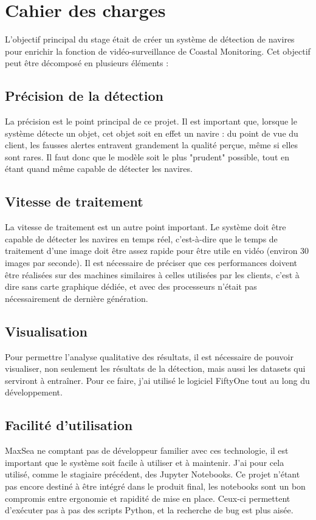 \chapter{Cahier des charges}

L'objectif principal du stage était de créer un système de détection de navires pour enrichir la fonction de 
vidéo-surveillance de Coastal Monitoring. Cet objectif peut être décomposé en plusieurs éléments : 

\section{Précision de la détection}

La précision est le point principal de ce projet. Il est important que, lorsque le 
système détecte un objet, cet objet soit en effet un navire : du point de vue du client, 
les fausses alertes entravent grandement la qualité perçue, même si elles sont rares. 
Il faut donc que le modèle soit le plus "prudent" possible, tout en étant quand même
capable de détecter les navires.

\section{Vitesse de traitement}

La vitesse de traitement est un autre point important. Le système doit être capable 
de détecter les navires en temps réel, c'est-à-dire que le temps de traitement d'une image
doit être assez rapide pour être utile en vidéo (environ 30 images par seconde).
Il est nécessaire de préciser que ces performances doivent être réalisées sur 
des machines similaires à celles utilisées par les clients, c'est à dire sans 
carte graphique dédiée, et avec des processeurs n'était pas nécessairement de 
dernière génération. 

\section{Visualisation}

Pour permettre l'analyse qualitative des résultats, il est nécessaire de pouvoir visualiser, 
non seulement les résultats de la détection, mais aussi les datasets qui serviront à entraîner. 
Pour ce faire, j'ai utilisé le logiciel FiftyOne tout au long du développement. 

\section{Facilité d'utilisation\label{facilite_utilisation}}

MaxSea ne comptant pas de développeur familier avec ces technologie, 
il est important que le système soit facile à utiliser et à maintenir.
J'ai pour cela utilisé, comme le stagiaire précédent, des Jupyter Notebooks. 
Ce projet n'étant pas encore destiné à être intégré dans le produit final,
les notebooks sont un bon compromis entre ergonomie et rapidité de mise en place. 
Ceux-ci permettent d'exécuter pas à pas des scripts Python, 
et la recherche de bug est plus aisée. 